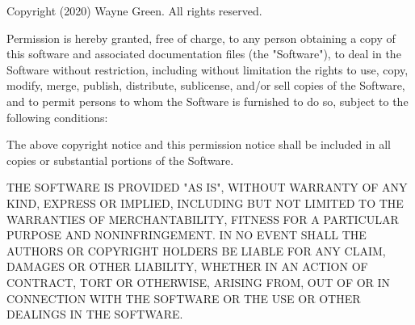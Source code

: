 \begin{quote}
\end{quote}
{\tiny
Copyright \wgcopyright (2020) Wayne Green. All rights reserved.

Permission is hereby granted, free of charge, to any person obtaining
a copy of this software and associated documentation files (the
"Software"), to deal in the Software without restriction, including
without limitation the rights to use, copy, modify, merge, publish,
distribute, sublicense, and/or sell copies of the Software, and to
permit persons to whom the Software is furnished to do so, subject to
the following conditions:

The above copyright notice and this permission notice shall be
included in all copies or substantial portions of the Software.

THE SOFTWARE IS PROVIDED "AS IS", WITHOUT WARRANTY OF ANY KIND,
EXPRESS OR IMPLIED, INCLUDING BUT NOT LIMITED TO THE WARRANTIES OF
MERCHANTABILITY, FITNESS FOR A PARTICULAR PURPOSE AND
NONINFRINGEMENT. IN NO EVENT SHALL THE AUTHORS OR COPYRIGHT HOLDERS BE
LIABLE FOR ANY CLAIM, DAMAGES OR OTHER LIABILITY, WHETHER IN AN ACTION
OF CONTRACT, TORT OR OTHERWISE, ARISING FROM, OUT OF OR IN CONNECTION
WITH THE SOFTWARE OR THE USE OR OTHER DEALINGS IN THE SOFTWARE.
}
